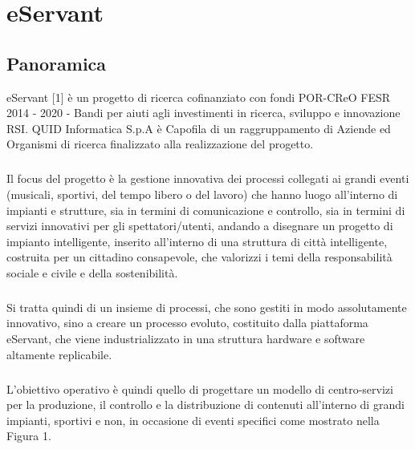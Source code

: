\chapter{eServant}

\section{Panoramica}
eServant [1] è un progetto di ricerca cofinanziato con fondi POR-CReO FESR 2014 - 2020 - Bandi per aiuti agli investimenti in ricerca, sviluppo e innovazione RSI. QUID Informatica S.p.A è Capofila di un raggruppamento di Aziende ed Organismi di ricerca finalizzato alla realizzazione del progetto.
\paragraph{}

Il focus del progetto è la gestione innovativa dei processi collegati ai grandi eventi (musicali, sportivi, del tempo libero o del lavoro) che hanno luogo all’interno di impianti e strutture, sia in termini di comunicazione e controllo, sia in termini di servizi innovativi per gli spettatori/utenti, andando a disegnare un progetto di impianto intelligente, inserito all’interno di una struttura di città intelligente, costruita per un cittadino consapevole, che valorizzi i temi della responsabilità sociale e civile e  della sostenibilità.
\paragraph{}

Si tratta quindi di un insieme di processi, che sono gestiti in modo assolutamente innovativo, sino a creare un processo evoluto, costituito dalla piattaforma eServant, che viene industrializzato in una struttura hardware e software altamente replicabile.
\paragraph{}

L’obiettivo operativo è quindi quello di progettare un modello di centro-servizi per la produzione, il controllo e la distribuzione di contenuti all’interno di grandi impianti, sportivi e non, in occasione di eventi specifici come mostrato nella Figura 1.
\paragraph{}


